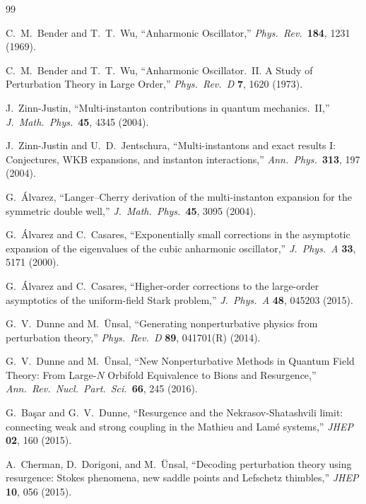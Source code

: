 \documentclass[12pt,a4paper]{article}
\numberwithin{equation}{section}
\theoremstyle{plain}
\theoremstyle{definition}
\theoremstyle{remark}
\begin{document}
\begin{thebibliography}{99}

C.~M.~Bender and T.~T.~Wu,
``Anharmonic Oscillator,''
\emph{Phys.\ Rev.}\ \textbf{184}, 1231 (1969).

C.~M.~Bender and T.~T.~Wu,
``Anharmonic Oscillator.~II. A Study of Perturbation Theory in Large Order,''
\emph{Phys.\ Rev.\ D} \textbf{7}, 1620 (1973).

J.~Zinn-Justin,
``Multi-instanton contributions in quantum mechanics.~II,''
\emph{J.\ Math.\ Phys.}\ \textbf{45}, 4345 (2004).

J.~Zinn-Justin and U.~D.~Jentschura,
``Multi-instantons and exact results I: Conjectures, WKB expansions, and
instanton interactions,''
\emph{Ann.\ Phys.}\ \textbf{313}, 197 (2004).

G.~\'Alvarez,
``Langer--Cherry derivation of the multi-instanton expansion for the
symmetric double well,''
\emph{J.\ Math.\ Phys.}\ \textbf{45}, 3095 (2004).

G.~\'Alvarez and C.~Casares,
``Exponentially small corrections in the asymptotic expansion of the
eigenvalues of the cubic anharmonic oscillator,''
\emph{J.\ Phys.\ A} \textbf{33}, 5171 (2000).

G.~\'Alvarez and C.~Casares,
``Higher-order corrections to the large-order asymptotics of the
uniform-field Stark problem,''
\emph{J.\ Phys.\ A} \textbf{48}, 045203 (2015).

G.~V.~Dunne and M.~\"Unsal,
``Generating nonperturbative physics from perturbation theory,''
\emph{Phys.\ Rev.\ D} \textbf{89}, 041701(R) (2014).

G.~V.~Dunne and M.~\"Unsal,
``New Nonperturbative Methods in Quantum Field Theory: From Large-$N$
Orbifold Equivalence to Bions and Resurgence,''
\emph{Ann.\ Rev.\ Nucl.\ Part.\ Sci.}\ \textbf{66}, 245 (2016).

G.~Ba\c{s}ar and G.~V.~Dunne,
``Resurgence and the Nekrasov-Shatashvili limit: connecting weak and
strong coupling in the Mathieu and Lam\'e systems,''
\emph{JHEP} \textbf{02}, 160 (2015).

A.~Cherman, D.~Dorigoni, and M.~\"Unsal,
``Decoding perturbation theory using resurgence: Stokes phenomena,
new saddle points and Lefschetz thimbles,''
\emph{JHEP} \textbf{10}, 056 (2015).


\end{thebibliography}
\end{document}
